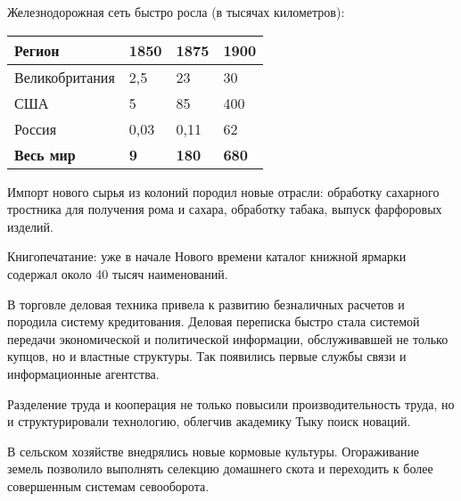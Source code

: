 \documentclass[a4paper]{article}
\begin{document}
{
Железнодорожная сеть быстро росла (в тысячах километров):}


\bigskip

\begin{center}
\tablefirsthead{}
\tablehead{}
\tabletail{}
\tablelasttail{}
\begin{supertabular}{|m{1.1538599in}|m{0.37685984in}|m{0.37685984in}|m{0.38375986in}|}
\hline
{\bfseries Регион} &
{\bfseries 1850} &
{\bfseries 1875} &
{\bfseries 1900}\\\hline
{ Великобритания} &
{ 2,5} &
{ 23} &
{ 30}\\\hline
{ США} &
{ 5} &
{ 85} &
{ 400}\\\hline
{ Россия} &
{ 0,03} &
{ 0,11} &
{ 62}\\\hline
{\bfseries Весь мир} &
{\bfseries 9} &
{\bfseries 180} &
{\bfseries 680}\\\hline
\end{supertabular}
\end{center}
{
Импорт нового сырья из колоний породил новые отрасли: обработку сахарного тростника для получения рома и сахара,
обработку табака, выпуск фарфоровых изделий. }

{
Книгопечатание: уже в начале Нового времени каталог книжной ярмарки содержал около 40 тысяч наименований. }

{
В торговле деловая техника привела к развитию безналичных расчетов и породила систему кредитования. Деловая переписка
быстро стала системой передачи экономической и политической информации, обслуживавшей не только купцов, но и властные
структуры. Так появились первые службы связи и информационные агентства.}

{
Разделение труда и кооперация не только повысили производительность труда, но и структурировали технологию, облегчив
академику Тыку поиск новаций.}

{
В сельском хозяйстве внедрялись новые кормовые культуры. Огораживание земель позволило выполнять селекцию домашнего
скота и переходить к более совершенным системам севооборота.}
\end{document}

